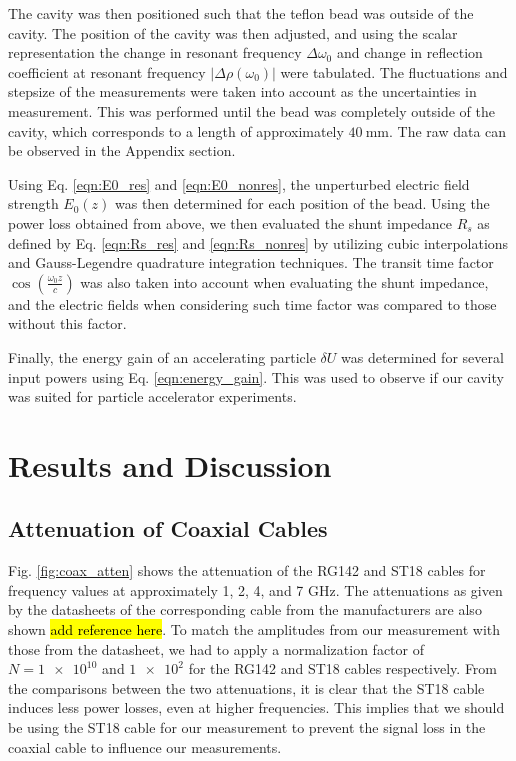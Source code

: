 \documentclass[a4paper]{report}
\numberwithin{equation}{section}
\begin{document}
The cavity was then positioned such that the teflon bead was outside of the
cavity. The position of the cavity was then adjusted, and using the scalar
representation the change in resonant frequency $\Delta\omega_0$ and change in
reflection coefficient at resonant frequency $|\Delta\rho(\omega_0)|$ were
tabulated. The fluctuations and stepsize of the measurements were taken into
account as the uncertainties in measurement. This was performed until the bead
was completely outside of the cavity, which corresponds to a length of
approximately $\SI{40}{\milli\metre}$. The raw data can be observed in the
Appendix section. \par 

Using Eq. \ref{eqn:E0_res} and \ref{eqn:E0_nonres}, the unperturbed electric
field strength $E_0(z)$ was then determined for each position of the bead. Using
the power loss obtained from above, we then evaluated the shunt impedance $R_s$
as defined by Eq. \ref{eqn:Rs_res} and \ref{eqn:Rs_nonres} by
utilizing cubic interpolations and Gauss-Legendre quadrature integration
techniques. The transit time factor $\cos(\frac{\omega_0 z}{c})$ was also taken
into account when evaluating the shunt impedance, and the electric fields when
considering such time factor was compared to those without this factor. \par 

Finally, the energy gain of an accelerating particle $\delta U$ was determined for several
input powers using Eq. \ref{eqn:energy_gain}. This was used to observe if our cavity was suited for particle
accelerator experiments.

\chapter{Results and Discussion}

\section{Attenuation of Coaxial Cables}

Fig. \ref{fig:coax_atten} shows the attenuation of the RG142 and ST18 cables for frequency values at approximately 1, 2, 4,  and 7 $\si{\giga\hertz}$. 
The attenuations as given by the datasheets of the corresponding cable from the manufacturers are also shown \hl{add reference here}. To match the
amplitudes from our measurement with those from the datasheet, we had to apply a normalization factor of $N = \num{1e10}$ and $\num{1e2}$ for the 
RG142 and ST18 cables respectively. From the comparisons between the two attenuations, it is clear that the ST18 cable induces less power losses, 
even at higher frequencies. This implies that we should be using the ST18 cable for our measurement to prevent the signal loss in the coaxial
cable to influence our measurements. \par 
\end{document}
